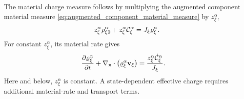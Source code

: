 The material charge measure follows by multiplying the augmented component
material measure \eqref{eq:augmented_component_material_measure} by
\(z_\xi^\alpha\),
%
\begin{equation}
	z_\xi^\alpha\rho_{\xi0}^\alpha
	+
	z_\xi^\alpha\mathcal{C}_\xi^\alpha
	=
	J_\xi\varrho_\xi^\alpha .
	\label{eq:augmented_component_material_charge_measure}
\end{equation}
%
For constant \(z_\xi^\alpha\), its material rate gives
%
\begin{align}
	\frac{\partial\varrho_\xi^\alpha}{\partial t}
	+
	\nabla_{\mathbf{x}}\cdot
	\left(
	\varrho_\xi^\alpha\mathbf{v}_\xi
	\right)
	&=
	\frac{
	z_\xi^\alpha\dot{\mathcal{C}}_\xi^\alpha
	}{J_\xi}.
	\label{eq:component_charge_material_rate}
\end{align}
%
Here and below, \(z_\xi^\alpha\) is constant.  A state-dependent effective
charge requires additional material-rate and transport terms.

